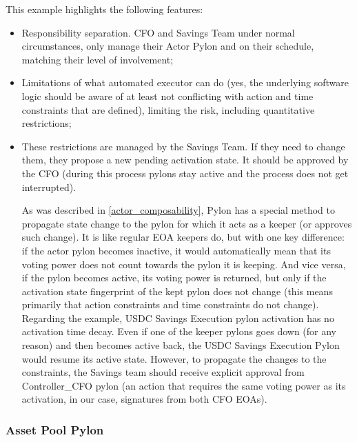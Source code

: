 \documentclass[12pt]{article}
\begin{document}
This example highlights the following features:
\begin{itemize}
\item{Responsibility separation. CFO and Savings Team under normal circumstances, only manage their Actor Pylon and on their schedule, matching their level of involvement;}
\item{Limitations of what automated executor can do (yes, the underlying software logic should be aware of at least not conflicting with action and time constraints that are defined), limiting the risk, including quantitative restrictions;}
\item{These restrictions are managed by the Savings Team. If they need to change them, they propose a new pending activation state. It should be approved by the CFO (during this process pylons stay active and the process does not get interrupted).

As was described in \ref{actor_composability}, Pylon has a special method to propagate state change to the pylon for which it acts as a keeper (or approves such change). It is like regular EOA keepers do, but with one key difference: if the actor pylon becomes inactive, it would automatically mean that its voting power does not count towards the pylon it is keeping. And vice versa, if the pylon becomes active, its voting power is returned, but only if the activation state fingerprint of the kept pylon does not change (this means primarily that action constraints and time constraints do not change). Regarding the example, USDC Savings Execution pylon activation has no activation time decay. Even if one of the keeper pylons goes down (for any reason) and then becomes active back, the USDC Savings Execution Pylon would resume its active state. However, to propagate the changes to the constraints, the Savings team should receive explicit approval from Controller\_CFO pylon (an action that requires the same voting power as its activation, in our case, signatures from both CFO EOAs).}
\end{itemize}

\pagebreak
\subsubsection{Asset Pool Pylon}
\end{document}
